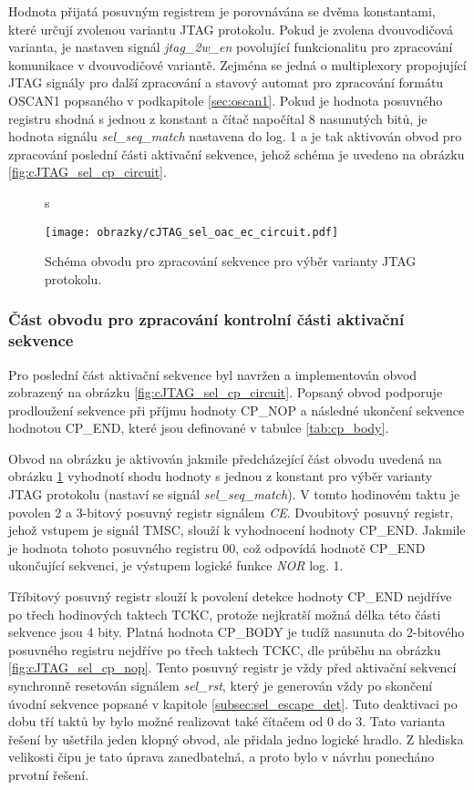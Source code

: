 Hodnota přijatá posuvným registrem je porovnávána se dvěma konstantami, které určují zvolenou variantu \acs{JTAG} protokolu. Pokud je zvolena dvouvodičová varianta, je nastaven signál \textit{jtag\_2w\_en} povolující funkcionalitu pro zpracování komunikace v dvouvodičové variantě. Zejména se jedná o multiplexory propojující \acs{JTAG} signály pro další zpracování a stavový automat pro  zpracování formátu OSCAN1 popsaného v podkapitole \ref{sec:oscan1}. Pokud je hodnota posuvného registru shodná s jednou z konstant a čítač napočítal 8 nasunutých bitů, je hodnota signálu \textit{sel\_seq\_match} nastavena do log. 1 a je tak aktivován obvod pro zpracování poslední části aktivační sekvence, jehož schéma je uvedeno na obrázku \ref{fig:cJTAG_sel_cp_circuit}. 

\begin{figure}[H]s
  \begin{center}
    \texttt{[image: obrazky/cJTAG\_sel\_oac\_ec\_circuit.pdf]}
  \end{center}
  \caption{Schéma obvodu pro zpracování sekvence pro výběr varianty \acs{JTAG} protokolu.}
	\label{fig:cJTAG_sel_oac_ec_circuit}
\end{figure}

\subsubsection{Část obvodu pro zpracování kontrolní části aktivační sekvence}
Pro poslední část aktivační sekvence byl navržen a implementován obvod zobrazený na obrázku \ref{fig:cJTAG_sel_cp_circuit}. Popsaný obvod podporuje prodloužení sekvence při příjmu hodnoty CP\_NOP a následné ukončení sekvence hodnotou CP\_END, které jsou definované v tabulce \ref{tab:cp_body}. %

Obvod na obrázku je aktivován jakmile předcházející část obvodu uvedená na obrázku \ref{fig:cJTAG_sel_oac_ec_circuit} vyhodnotí shodu hodnoty s jednou z konstant pro výběr varianty \acs{JTAG} protokolu (nastaví se signál \textit{sel\_seq\_match}). V tomto hodinovém taktu je povolen 2 a 3-bitový posuvný registr signálem \textit{CE}. Dvoubitový posuvný registr, jehož vstupem je signál \acs{TMSC}, slouží k vyhodnocení hodnoty CP\_END. Jakmile je hodnota tohoto posuvného registru 00, což odpovídá hodnotě CP\_END ukončující sekvenci, je výstupem logické funkce \textit{NOR} log. 1.

Tříbitový posuvný registr slouží k povolení detekce hodnoty CP\_END nejdříve po třech hodinových taktech \acs{TCKC}, protože nejkratší možná délka této části sekvence jsou 4 bity. Platná hodnota CP\_BODY je tudíž nasunuta do 2-bitového posuvného registru nejdříve po třech taktech \acs{TCKC}, dle průběhu na obrázku \ref{fig:cJTAG_sel_cp_nop}. Tento posuvný registr je vždy před aktivační sekvencí synchronně resetován signálem \textit{sel\_rst}, který je generován vždy po skončení úvodní sekvence popsané v kapitole \ref{subsec:sel_escape_det}. Tuto deaktivaci po dobu tří taktů by bylo možné realizovat také čítačem od 0 do 3. Tato varianta řešení by ušetřila jeden klopný obvod, ale přidala jedno logické hradlo. Z hlediska velikosti čipu je tato úprava zanedbatelná, a proto bylo v návrhu ponecháno prvotní řešení.


